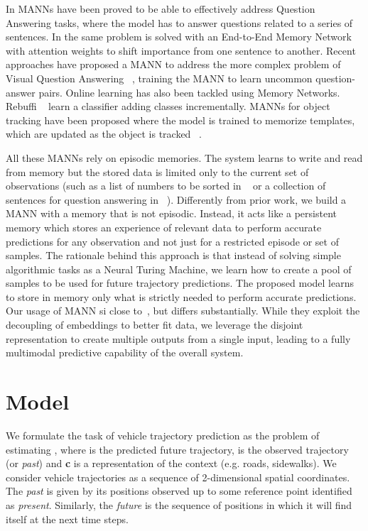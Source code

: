 \documentclass[10pt,twocolumn,letterpaper]{article}
\begin{document}
In \cite{weston2014memory} MANNs have been proved to be able to effectively address Question Answering tasks, where the model has to answer questions related to a series of sentences. In \cite{sukhbaatar2015end} the same problem is solved with an End-to-End Memory Network with attention weights to shift importance from one sentence to another. Recent approaches have proposed a MANN to address the more complex problem of Visual Question Answering ~\cite{kumar2016ask, ma2018visual}, training the MANN to learn uncommon question-answer pairs.
Online learning has also been tackled using Memory Networks. Rebuffi \etal~\cite{rebuffi2017icarl} learn a classifier adding classes incrementally. MANNs for object tracking have been proposed where the model is trained to memorize templates, which are updated as the object is tracked ~\cite{yang2018learning}.


All these MANNs rely on episodic memories. The system learns to write and read from memory but the stored data is limited only to the current set of observations (such as a list of numbers to be sorted in ~\cite{graves2014neural} or a collection of sentences for question answering in ~\cite{weston2014memory}). 
Differently from prior work, we build a MANN with a memory that is not episodic. Instead, it acts like a persistent memory which stores an experience of relevant data to perform accurate predictions for any observation and not just for a restricted episode or set of samples.
The rationale behind this approach is that instead of solving simple algorithmic tasks as a Neural Turing Machine, we learn how to create a pool of samples to be used for future trajectory predictions.
The proposed model learns to store in memory only what is strictly needed to perform accurate predictions.  Our usage of MANN si close to~\cite{miller2016key}, but differs substantially. While they exploit the decoupling of embeddings to better fit data, we leverage the disjoint representation to create multiple outputs from a single input, leading to a fully multimodal predictive capability of the overall system. 



\section{Model}

We formulate the task of vehicle trajectory prediction as the problem of estimating , where  is the predicted future trajectory,  is the observed trajectory (or \textit{past}) and \textbf{c} is a representation of the context (e.g. roads, sidewalks). We consider vehicle trajectories as a sequence of 2-dimensional spatial coordinates. The \textit{past}  is given by its positions observed up to some reference point identified as \textit{present}. Similarly, the \textit{future}  is the sequence of positions in which it will find itself at the next time steps.
\end{document}
